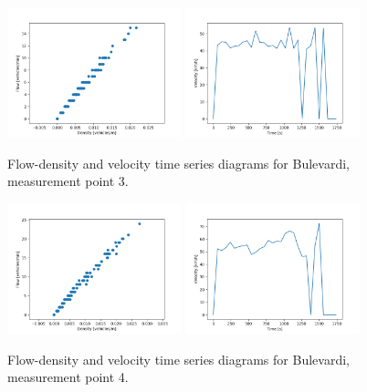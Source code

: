 \documentclass[english, 12pt, a4paper, elec, utf8, pdfa, online]{aaltothesis}
\begin{document}
\clearpage
\begin{figure}[ht!]
    \centering
    \includegraphics[width=0.45\textwidth]{graphs/Bulevardi_3_flw_dns.png}
    \includegraphics[width=0.45\textwidth]{graphs/Bulevardi_3_spd_time_6.png}
    \caption{Flow-density and velocity time series diagrams for Bulevardi, measurement point 3.}
\end{figure}
\begin{figure}[ht!]
    \centering
    \includegraphics[width=0.45\textwidth]{graphs/Bulevardi_4_flw_dns.png}
    \includegraphics[width=0.45\textwidth]{graphs/Bulevardi_4_spd_time_6.png}
    \caption{Flow-density and velocity time series diagrams for Bulevardi, measurement point 4.}
\end{figure}
\end{document}
